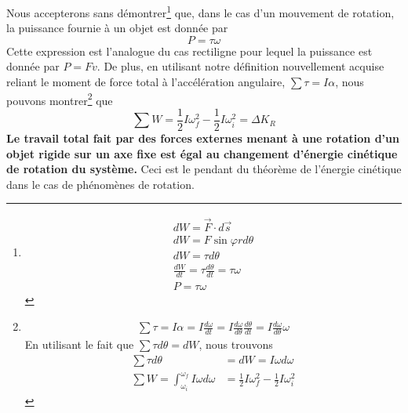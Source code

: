 \documentclass[titlepage,oneside,a4paper,11pt]{book} %
\begin{document}
Nous accepterons sans démontrer\footnote{
\begin{align*}
dW = \vec{F}\cdot d\vec{s}\\
dW = F\sin \varphi r d\theta\\
dW = \tau d\theta\\
\frac{dW}{dt} = \tau \frac{d\theta}{dt} = \tau \omega\\
P = \tau \omega
\end{align*}
} que, dans le cas d'un mouvement de rotation, la puissance fournie à un objet est donnée par
\begin{equation}
P = \tau \omega
\end{equation}
Cette expression est l'analogue du cas rectiligne pour lequel la puissance est donnée par $P = Fv$. De plus, en utilisant notre définition nouvellement acquise reliant le moment de force total à l'accélération angulaire, $\sum \tau = I\alpha$, nous pouvons montrer\footnote{
\begin{align*}  
\sum \tau=I \alpha=I \frac{d \omega}{d t}=I \frac{d \omega}{d \theta} \frac{d \theta}{d t}=I \frac{d \omega}{d \theta} \omega
\end{align*}
En utilisant le fait que $\sum \tau d\theta = dW$, nous trouvons
\begin{align*}
\sum \tau d \theta&=d W=I \omega d \omega\\
\sum W=\int_{\omega_{i}}^{\omega_{f}} I \omega d \omega&=\frac{1}{2} I \omega_{f}^{2}-\frac{1}{2} I \omega_{i}^{2}
\end{align*}
} que
\begin{equation}
\sum W=\frac{1}{2} I \omega_{f}^{2}-\frac{1}{2} I \omega_{i}^{2} = \Delta K_R
\end{equation}
\textbf{Le travail total fait par des forces externes menant à une rotation d'un objet rigide sur un axe fixe est égal au changement d'énergie cinétique de rotation du système.} Ceci est le pendant du théorème de l'énergie cinétique dans le cas de phénomènes de rotation.
\end{document}
